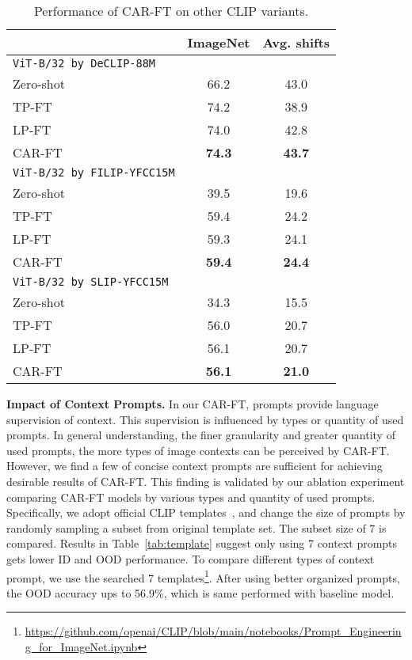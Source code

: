 \documentclass[pdflatex,sn-basic,iicol]{sn-jnl}
\theoremstyle{thmstyleone}\newtheorem{theorem}{Theorem}\newtheorem{proposition}[theorem]{Proposition}
\theoremstyle{thmstyletwo}\newtheorem{example}{Example}\newtheorem{remark}{Remark}
\theoremstyle{thmstylethree}\newtheorem{definition}{Definition}
\begin{document}
\begin{table}[t]\footnotesize
\begin{center}
\caption{Performance of CAR-FT on other CLIP variants.} \label{tab:beyond}
\begin{tabular}{lc|c}
\toprule
 & ImageNet & Avg. shifts \\
\midrule
\texttt{ViT-B/32 by DeCLIP-88M} &  &  \\
\quad  Zero-shot & 66.2 & 43.0 \\
\quad  TP-FT & 74.2 & 38.9 \\
\quad  LP-FT & 74.0 & 42.8 \\
\rowcolor{tabhighlight}
\quad  CAR-FT & \textbf{74.3} & \textbf{43.7} \\
\midrule
\texttt{ViT-B/32 by FILIP-YFCC15M} & & \\
\quad  Zero-shot & 39.5 & 19.6 \\
\quad  TP-FT & 59.4 & 24.2 \\
\quad  LP-FT & 59.3 & 24.1 \\
\rowcolor{tabhighlight}
\quad  CAR-FT & \textbf{59.4} & \textbf{24.4} \\
\midrule
\texttt{ViT-B/32 by SLIP-YFCC15M} & & \\
\quad  Zero-shot & 34.3 & 15.5 \\
\quad  TP-FT & 56.0 & 20.7 \\
\quad  LP-FT & 56.1 & 20.7 \\
\rowcolor{tabhighlight}
\quad  CAR-FT & \textbf{56.1} & \textbf{21.0} \\
\bottomrule
\end{tabular}
\end{center}
\end{table}

\noindent\textbf{Impact of Context Prompts.} In our CAR-FT, prompts provide language supervision of context. This supervision is influenced by types or quantity of used prompts. In general understanding, the finer granularity and greater quantity of used prompts, the more types of image contexts can be perceived by CAR-FT. However, we find a few of concise context prompts are sufficient for achieving desirable results of CAR-FT. This finding is validated by our ablation experiment comparing CAR-FT models by various types and quantity of used prompts. Specifically, we adopt official CLIP templates~\citep{radford2021learning}, and change the size of prompts by randomly sampling a subset from original template set. The subset size of 7 is compared. Results in Table~\ref{tab:template} suggest only using 7 context prompts gets lower ID and OOD performance. To compare different types of context prompt, we use the searched 7 templates\footnote{\url{https://github.com/openai/CLIP/blob/main/notebooks/Prompt_Engineering_for_ImageNet.ipynb}}. After using better organized prompts, the OOD accuracy ups to 56.9\%, which is same performed with baseline model. 
\end{document}
